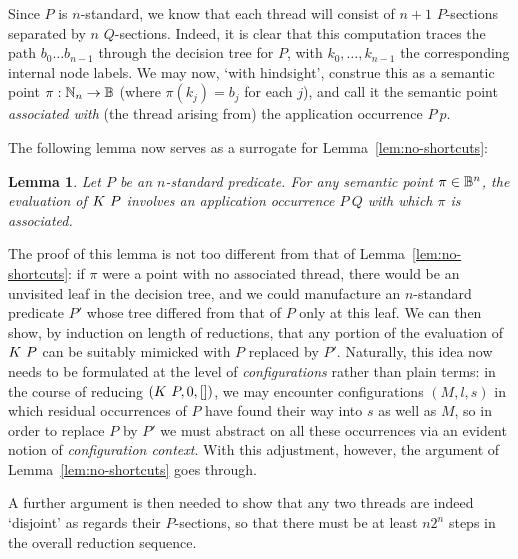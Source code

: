 \documentclass[12pt,phd,lfcs,twoside,openright,logo,leftchapter,normalheadings]{infthesis}
\theoremstyle{plain}
\newtheorem{lemma}[theorem]{Lemma}
\theoremstyle{definition}
\begin{document}
Since $P$ is $n$-standard, we know that each thread will consist of
$n+1$ $P$-sections separated by $n$ $Q$-sections.
%
Indeed, it is clear that this computation traces the path
$b_0 \ldots b_{n-1}$ through the decision tree for $P$, with
$k_0,\ldots,k_{n-1}$ the corresponding internal node labels.  We may
now, `with hindsight', construe this as a semantic point
$\pi : \mathbb{N}_n \to \mathbb{B}$ (where $\pi(k_j)=b_j$ for each $j$), and call it
the semantic point \emph{associated with} (the thread arising from)
the application occurrence $P~p$.

The following lemma now serves as a surrogate for
Lemma~\ref{lem:no-shortcuts}:

\begin{lemma}
  Let $P$ be an $n$-standard predicate. For any semantic point
  $\pi \in \mathbb{B}^n$, the evaluation of $K~P$ involves an
  application occurrence $P~Q$ with which $\pi$ is associated.
\end{lemma}
%
The proof of this lemma is not too different from that of
Lemma~\ref{lem:no-shortcuts}: if $\pi$ were a point with no associated
thread, there would be an unvisited leaf in the decision tree, and we
could manufacture an $n$-standard predicate $P'$ whose tree differed
from that of $P$ only at this leaf. We can then show, by induction on
length of reductions, that any portion of the evaluation of
$K~P$ can be suitably mimicked with $P$ replaced by $P'$.
Naturally, this idea now needs to be formulated at the level of
\emph{configurations} rather than plain terms: in the course of
reducing $(K~P,0,[])$, we may encounter configurations
$(M,l,s)$ in which residual occurrences of $P$ have found their way
into $s$ as well as $M$, so in order to replace $P$ by $P'$ we must
abstract on all these occurrences via an evident notion of
\emph{configuration context}.  With this adjustment, however, the
argument of Lemma~\ref{lem:no-shortcuts} goes through.

A further argument is then needed to show that any two threads are
indeed ‘disjoint’ as regards their $P$-sections, so that there must be
at least $n2^n$ steps in the overall reduction sequence.

\end{document}
